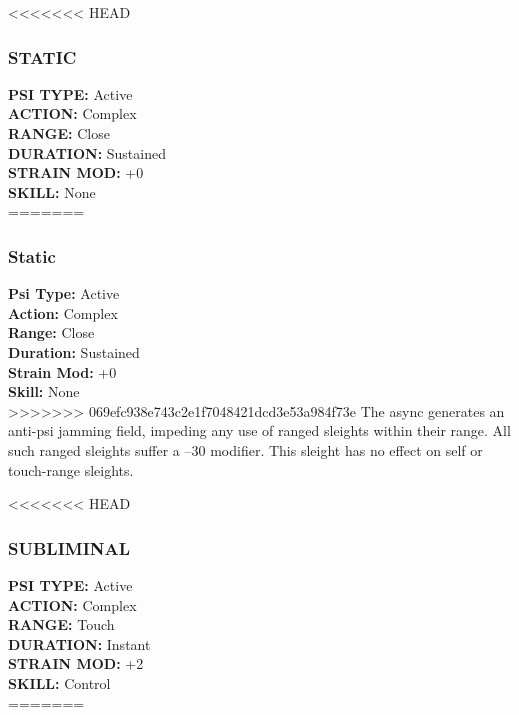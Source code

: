 <<<<<<< HEAD
\subsubsection{STATIC}
\textbf{PSI TYPE:} Active \\ 
\textbf{ACTION:} Complex \\ 
\textbf{RANGE:} Close \\ 
\textbf{DURATION:} Sustained \\
\textbf{STRAIN MOD:} +0 \\ 
\textbf{SKILL:} None\\
=======
\subsubsection{Static}
\textbf{Psi Type:} Active \\ 
\textbf{Action:} Complex \\ 
\textbf{Range:} Close \\ 
\textbf{Duration:} Sustained \\
\textbf{Strain Mod:} +0 \\ 
\textbf{Skill:} None\\
>>>>>>> 069efc938e743c2e1f7048421dcd3e53a984f73e
The async generates an anti-psi jamming field, impeding
any use of ranged sleights within their range. All
such ranged sleights suffer a –30 modifier. This sleight
has no effect on self or touch-range sleights.

<<<<<<< HEAD
\subsubsection{SUBLIMINAL}
\textbf{PSI TYPE:} Active \\ 
\textbf{ACTION:} Complex \\ 
\textbf{RANGE:} Touch \\ 
\textbf{DURATION:} Instant \\
\textbf{STRAIN MOD:} +2 \\ 
\textbf{SKILL:} Control\\
=======
